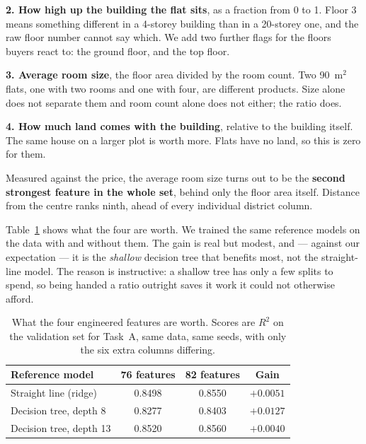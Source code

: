 \documentclass[10pt,twocolumn,a4paper]{article}
\begin{document}
\textbf{2. How high up the building the flat sits}, as a fraction from 0
to 1. Floor 3 means something different in a 4-storey building than in a
20-storey one, and the raw floor number cannot say which. We add two
further flags for the floors buyers react to: the ground floor, and the
top floor.

\textbf{3. Average room size}, the floor area divided by the room count.
Two 90~m$^2$ flats, one with two rooms and one with four, are different
products. Size alone does not separate them and room count alone does not
either; the ratio does.

\textbf{4. How much land comes with the building}, relative to the
building itself. The same house on a larger plot is worth more. Flats
have no land, so this is zero for them.

Measured against the price, the average room size turns out to be the
\textbf{second strongest feature in the whole set}, behind only the floor
area itself. Distance from the centre ranks ninth, ahead of every
individual district column.

Table~\ref{tab:fe} shows what the four are worth. We trained the same
reference models on the data with and without them. The gain is real but
modest, and --- against our expectation --- it is the \emph{shallow}
decision tree that benefits most, not the straight-line model. The reason
is instructive: a shallow tree has only a few splits to spend, so being
handed a ratio outright saves it work it could not otherwise afford.

\begin{table}[t]
  \centering
  \caption{What the four engineered features are worth. Scores are
  $R^2$ on the validation set for Task~A, same data, same seeds, with
  only the six extra columns differing.}
  \label{tab:fe}
  \small
  \begin{tabular}{@{}lccc@{}}
    \toprule
    Reference model & 76 features & 82 features & Gain \\
    \midrule
    Straight line (ridge)   & 0.8498 & 0.8550 & $+0.0051$ \\
    Decision tree, depth 8  & 0.8277 & 0.8403 & $+0.0127$ \\
    Decision tree, depth 13 & 0.8520 & 0.8560 & $+0.0040$ \\
    \bottomrule
  \end{tabular}
\end{table}
\end{document}
